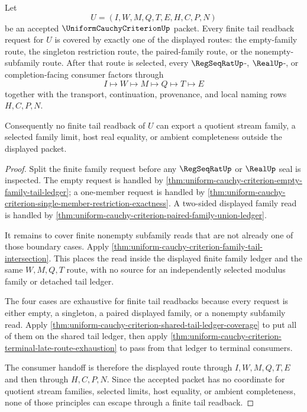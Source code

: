 \begin{theorem}
\label{thm:uniform-cauchy-criterion-finite-tail-readback-coverage}
Let
$$
U=(I,W,M,Q,T,E,H,C,P,N)
$$
be an accepted $\UniformCauchyCriterionUp$ packet. Every finite tail readback request for $U$ is covered by exactly one of the displayed routes: the empty-family route, the singleton restriction route, the paired-family route, or the nonempty-subfamily route. After that route is selected, every $\RegSeqRatUp$-, $\RealUp$-, or completion-facing consumer factors through
$$
I \longmapsto W \longmapsto M \longmapsto Q \longmapsto T \longmapsto E
$$
together with the transport, continuation, provenance, and local naming rows $H,C,P,N$.

Consequently no finite tail readback of $U$ can export a quotient stream family, a selected family limit, host real equality, or ambient completeness outside the displayed packet.
\end{theorem}
\begin{proof}
Split the finite family request before any $\RegSeqRatUp$ or $\RealUp$ seal is inspected. The empty request is handled by \autoref{thm:uniform-cauchy-criterion-empty-family-tail-ledger}; a one-member request is handled by \autoref{thm:uniform-cauchy-criterion-single-member-restriction-exactness}. A two-sided displayed family read is handled by \autoref{thm:uniform-cauchy-criterion-paired-family-union-ledger}.

It remains to cover finite nonempty subfamily reads that are not already one of those boundary cases. Apply \autoref{thm:uniform-cauchy-criterion-family-tail-intersection}. This places the read inside the displayed finite family ledger and the same $W,M,Q,T$ route, with no source for an independently selected modulus family or detached tail ledger.

The four cases are exhaustive for finite tail readbacks because every request is either empty, a singleton, a paired displayed family, or a nonempty subfamily read. Apply \autoref{thm:uniform-cauchy-criterion-shared-tail-ledger-coverage} to put all of them on the shared tail ledger, then apply \autoref{thm:uniform-cauchy-criterion-terminal-late-route-exhaustion} to pass from that ledger to terminal consumers.

The consumer handoff is therefore the displayed route through $I,W,M,Q,T,E$ and then through $H,C,P,N$. Since the accepted packet has no coordinate for quotient stream families, selected limits, host equality, or ambient completeness, none of those principles can escape through a finite tail readback.
\end{proof}

